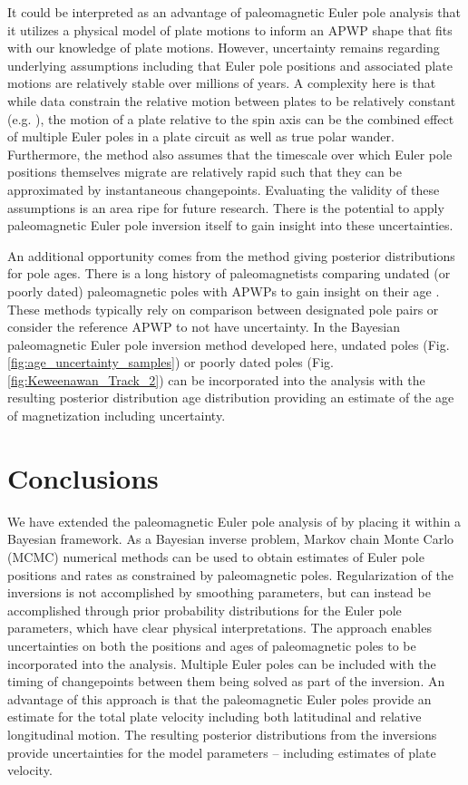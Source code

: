 \documentclass[]{agujournal2019}
\begin{document}
It could be interpreted as an advantage of paleomagnetic Euler pole analysis that it utilizes a physical model of plate motions to inform an APWP shape that fits with our knowledge of plate motions. However, uncertainty remains regarding underlying assumptions including that Euler pole positions and associated plate motions are relatively stable over millions of years. A complexity here is that while data constrain the relative motion between plates to be relatively constant (e.g. ), the motion of a plate relative to the spin axis can be the combined effect of multiple Euler poles in a plate circuit as well as true polar wander. Furthermore, the method also assumes that the timescale over which Euler pole positions themselves migrate are relatively rapid such that they can be approximated by instantaneous changepoints. Evaluating the validity of these assumptions is an area ripe for future research. There is the potential to apply paleomagnetic Euler pole inversion itself to gain insight into these uncertainties.

An additional opportunity comes from the method giving posterior distributions for pole ages. There is a long history of paleomagnetists comparing undated (or poorly dated) paleomagnetic poles with APWPs to gain insight on their age \cite{McCabe1984b, Hnatyshin2014a}. These methods typically rely on comparison between designated pole pairs or consider the reference APWP to not have uncertainty. In the Bayesian paleomagnetic Euler pole inversion method developed here, undated poles (Fig. \ref{fig:age_uncertainty_samples}) or poorly dated poles (Fig. \ref{fig:Keweenawan_Track_2}) can be incorporated into the analysis with the resulting posterior distribution age distribution providing an estimate of the age of magnetization including uncertainty. 

\section{Conclusions}
\label{sec:conclusions}

We have extended the paleomagnetic Euler pole analysis of  by placing it within a Bayesian framework. As a Bayesian inverse problem, Markov chain Monte Carlo (MCMC) numerical methods can be used to obtain estimates of Euler pole positions and rates as constrained by paleomagnetic poles. Regularization of the inversions is not accomplished by smoothing parameters, but can instead be accomplished through prior probability distributions for the Euler pole parameters, which have clear physical interpretations. The approach enables uncertainties on both the positions and ages of paleomagnetic poles to be incorporated into the analysis. Multiple Euler poles can be included with the timing of changepoints between them being solved as part of the inversion. An advantage of this approach is that the paleomagnetic Euler poles provide an estimate for the total plate velocity including both latitudinal and relative longitudinal motion. The resulting posterior distributions from the inversions provide uncertainties for the model parameters -- including estimates of plate velocity.
\end{document}
